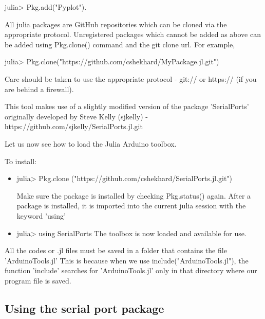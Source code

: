 julia> Pkg.add("Pyplot").

All julia packages are GitHub repositories which can be cloned via the appropriate protocol. Unregistered packages which cannot be added as above can be added using Pkg.clone() command and the git clone url. For example,

julia> Pkg.clone("https://github.com/cshekhard/MyPackage.jl.git") 

Care should be taken to use the appropriate protocol - git:// or https:// (if you are behind a firewall). 

This tool makes use of a slightly modified version of the package 'SerialPorts' originally developed by Steve Kelly (sjkelly) - https://github.com/sjkelly/SerialPorts.jl.git 

Let us now see how to load the Julia Arduino toolbox. 


To install:
\begin {itemize}
\item julia> Pkg.clone ("https://github.com/cshekhard/SerialPorts.jl.git")

Make sure the package is installed by checking Pkg.status() again.
After a package is installed, it is imported into the current julia session with the keyword 'using'

\item julia> using SerialPorts
The toolbox is now loaded and available for use. 

\end{itemize}

All the codes or .jl files must be saved in a folder that contains the file 'ArduinoTools.jl'
This is because when we use include("ArduinoTools.jl"), the function 'include' searches for 'ArduinoTools.jl' only in that directory where our program file is saved.




\subsection{Using the serial port package}

